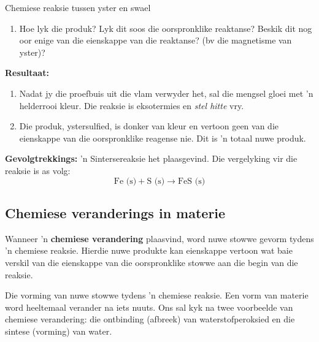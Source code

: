 \begin{g_experiment}{Chemiese reaksie tussen yster en swael}
\begin{enumerate}[noitemsep, label=\textbf{\arabic*}. ]
\label{m38709*uid24}\item Hoe lyk die produk? Lyk dit soos die oorspronklike reaktanse? Beskik dit nog oor enige van die eienskappe van
die reaktanse? (bv die magnetisme van yster)?
\end{enumerate}
        \par 
        \label{m38709*eip-963}
	\par
      \label{m38709*id63554}\noindent{}\textbf{Resultaat:}
          \newline
        \label{m38709*id63560}\begin{enumerate}[noitemsep, label=\textbf{\arabic*}. ] 
            \label{m38709*uid25}\item Nadat jy die proefbuis uit die vlam verwyder het, sal die mengsel gloei met 'n helderrooi kleur. Die reaksie is
eksotermies en \textsl{stel hitte} vry.
\label{m38709*uid26}\item Die produk, ystersulfied, is donker van kleur en vertoon geen van die eienskappe van die oorspronklike reagense nie. Dit is 'n totaal nuwe produk.
\end{enumerate}
        \par 
        \label{m38709*id63594}\noindent{}\textbf{Gevolgtrekkings:}
          \newline
'n Sintersereaksie het plaasgevind. Die vergelyking vir die reaksie is as volg:
        \label{m38709*id63604}\nopagebreak\noindent{}
    \begin{equation*}
    \text{Fe (s)}+\text{S (s)}\to \text{FeS (s)}
      \end{equation*}
    \par 
\end{g_experiment}
    \label{m38709*cid3}
            \subsection*{Chemiese veranderings in materie}
            \nopagebreak
      \label{m38709*id62778}Wanneer 'n \textbf{chemiese verandering} plaasvind, word nuwe stowwe gevorm tydens 'n chemiese reaksie. Hierdie nuwe produkte kan eienskappe vertoon wat baie verskil van die eienskappe van die oorspronklike stowwe aan die begin van die reaksie.\par 
            \label{m38709*fhsst!!!underscore!!!id107}
  { \label{m38709*meaningfhsst!!!underscore!!!id107}
     Die vorming van nuwe stowwe tydens 'n chemiese reaksie. Een vorm van materie word heeltemaal verander na iets nuuts.
       } 
Ons sal kyk na twee voorbeelde van chemiese verandering: die ontbinding (afbreek) van waterstofperoksied en die sintese
(vorming) van water. \\

